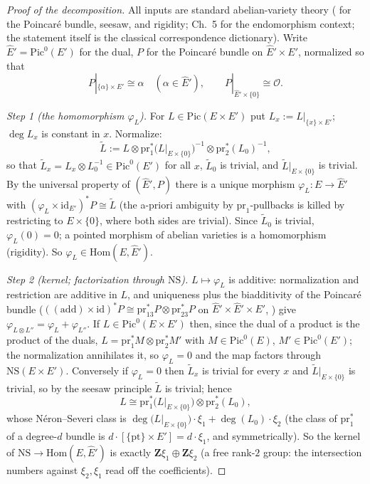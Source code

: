 \documentclass[11pt]{article}
\theoremstyle{definition}
\theoremstyle{remark}
\newcommand{\Z}{\mathbf{Z}}
\newcommand{\NS}{\mathrm{NS}}
\newcommand{\Hom}{\mathrm{Hom}}
\newcommand{\Pic}{\mathrm{Pic}}
\newcommand{\pr}{\mathrm{pr}}
\begin{document}
\begin{proof}[Proof of the decomposition]
All inputs are standard abelian-variety theory (\cite[Ch.~2]{BL} for the
Poincar\'e bundle, seesaw, and rigidity; Ch.~5 for the endomorphism context;
the statement itself is the classical correspondence dictionary). Write
$\hat{E}' = \Pic^0(E')$ for the dual, $P$ for the Poincar\'e bundle on
$\hat{E}' \times E'$, normalized so that
\[
P|_{\{\alpha\}\times E'} \cong \alpha\quad(\alpha \in \hat{E}'),
\qquad P|_{\hat{E}'\times\{0\}}\cong\mathcal O.
\]

\emph{Step 1 (the homomorphism $\varphi_L$).} For $L \in \Pic(E\times E')$
put $L_x := L|_{\{x\}\times E'}$; $\deg L_x$ is constant in $x$. Normalize:
\[
\widetilde{L} := L \otimes \pr_1^*\bigl(L|_{E\times\{0\}}\bigr)^{-1}
 \otimes \pr_2^*(L_0)^{-1} ,
\]
so that $\widetilde{L}_x = L_x \otimes L_0^{-1} \in \Pic^0(E')$ for all $x$,
$\widetilde{L}_0$ is trivial, and $\widetilde{L}|_{E\times\{0\}}$ is
trivial. By the universal property of $(\hat{E}', P)$ there is a unique
morphism $\varphi_L\colon E \to \hat{E}'$ with
$(\varphi_L \times \mathrm{id}_{E'})^* P \cong \widetilde{L}$ (the a-priori
ambiguity by $\pr_1$-pullbacks is killed by restricting to $E\times\{0\}$,
where both sides are trivial). Since $\widetilde{L}_0$ is trivial,
$\varphi_L(0) = 0$; a pointed morphism of abelian varieties is a
homomorphism (rigidity). So $\varphi_L \in \Hom(E, \hat{E}')$.

\emph{Step 2 (kernel; factorization through $\NS$).} $L \mapsto \varphi_L$
is additive: normalization and restriction are additive in $L$, and
uniqueness plus the biadditivity of the Poincar\'e bundle
($((\mathrm{add})\times\mathrm{id})^* P \cong \pr_{13}^* P \otimes
\pr_{23}^* P$ on $\hat{E}'\times\hat{E}'\times E'$, \cite[Ch.~2]{BL}) give
$\varphi_{L\otimes L''} = \varphi_L + \varphi_{L''}$. If
$L \in \Pic^0(E\times E')$ then, since the dual of a product is the product
of the duals, $L = \pr_1^* M \otimes \pr_2^* M'$ with $M \in \Pic^0(E)$,
$M' \in \Pic^0(E')$; the normalization annihilates it, so $\varphi_L = 0$
and the map factors through $\NS(E\times E')$. Conversely if
$\varphi_L = 0$ then $\widetilde{L}_x$ is trivial for every $x$ and
$\widetilde{L}|_{E\times\{0\}}$ is trivial, so by the seesaw principle
$\widetilde{L}$ is trivial; hence
\[
L \cong \pr_1^*\bigl(L|_{E\times\{0\}}\bigr) \otimes \pr_2^*(L_0) ,
\]
whose N\'eron--Severi class is
$\deg\bigl(L|_{E\times\{0\}}\bigr)\cdot\xi_1 + \deg(L_0)\cdot\xi_2$ (the
class of $\pr_1^*$ of a degree-$d$ bundle is
$d\cdot[\{\mathrm{pt}\}\times E'] = d\cdot\xi_1$, and symmetrically). So the
kernel of $\NS \to \Hom(E, \hat{E}')$ is exactly $\Z\xi_1 \oplus \Z\xi_2$ (a
free rank-$2$ group: the intersection numbers against $\xi_2, \xi_1$ read
off the coefficients).


\end{proof}
\end{document}
